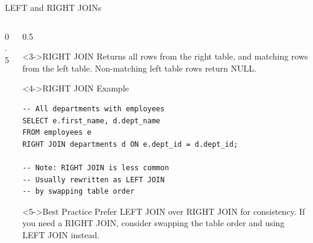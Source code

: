 \documentclass[aspectratio=169,11pt]{beamer}
\begin{document}
\begin{frame}[fragile]{LEFT and RIGHT JOINs}
\begin{columns}[T]
\begin{column}{0.5\textwidth}
\end{column}

\pause
\begin{column}{0.5\textwidth}
\begin{block}<3->{RIGHT JOIN}
Returns all rows from the right table, and matching rows from the left table. Non-matching left table rows return NULL.
\end{block}

\begin{exampleblock}<4->{RIGHT JOIN Example}
\begin{lstlisting}
-- All departments with employees
SELECT e.first_name, d.dept_name
FROM employees e
RIGHT JOIN departments d ON e.dept_id = d.dept_id;

-- Note: RIGHT JOIN is less common
-- Usually rewritten as LEFT JOIN
-- by swapping table order
\end{lstlisting}
\end{exampleblock}

\pause
\begin{alertblock}<5->{Best Practice}
Prefer LEFT JOIN over RIGHT JOIN for consistency. If you need a RIGHT JOIN, consider swapping the table order and using LEFT JOIN instead.
\end{alertblock}
\end{column}
\end{columns}
\end{frame}
\end{document}
